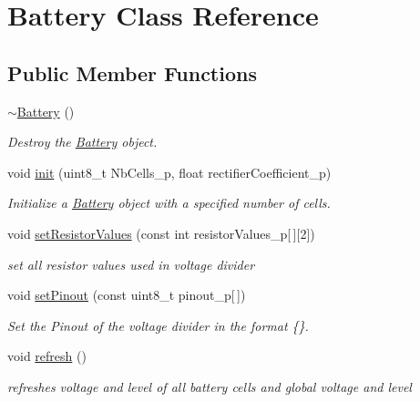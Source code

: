 \hypertarget{class_battery}{}\section{Battery Class Reference}
\label{class_battery}
\subsection*{Public Member Functions}
\begin{DoxyCompactItemize}
\item 
\mbox{\label{class_battery_a637d8766eb5cbdb33ab2a19a30622bc3}} 
\hyperlink{class_battery_a637d8766eb5cbdb33ab2a19a30622bc3}{$\sim$\+Battery} ()
\begin{DoxyCompactList}\small\item\em Destroy the \hyperlink{class_battery}{Battery} object. \end{DoxyCompactList}\item 
void \hyperlink{class_battery_aed541975df2c26475cbc0c37a9ddf659}{init} (uint8\+\_\+t Nb\+Cells\+\_\+p, float rectifier\+Coefficient\+\_\+p)
\begin{DoxyCompactList}\small\item\em Initialize a \hyperlink{class_battery}{Battery} object with a specified number of cells. \end{DoxyCompactList}\item 
void \hyperlink{class_battery_afb257ecd2eab7ed446d15ea9e78cc074}{set\+Resistor\+Values} (const int resistor\+Values\+\_\+p\mbox{[}$\,$\mbox{]}\mbox{[}2\mbox{]})
\begin{DoxyCompactList}\small\item\em set all resistor values used in voltage divider \end{DoxyCompactList}\item 
void \hyperlink{class_battery_a580d9582fbcf2c5f8185e3007852f73d}{set\+Pinout} (const uint8\+\_\+t pinout\+\_\+p\mbox{[}$\,$\mbox{]})
\begin{DoxyCompactList}\small\item\em Set the Pinout of the voltage divider in the format \{\}. \end{DoxyCompactList}\item 
\mbox{\label{class_battery_a7289442b8119494f06080d843c261c74}} 
void \hyperlink{class_battery_a7289442b8119494f06080d843c261c74}{refresh} ()
\begin{DoxyCompactList}\small\item\em refreshes voltage and level of all battery cells and global voltage and level \end{DoxyCompactList}\item 

\end{DoxyCompactItemize}
